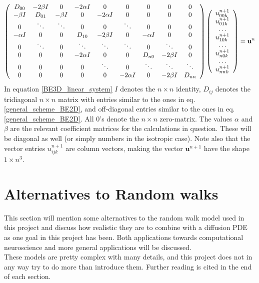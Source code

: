 \begin{align}\label{BE3D_linear_system}
  \left(\begin{array}{c c c c c c c c c}
        D_{00} & -2\beta I &0 &-2\alpha I &0 &0 &0 &0 &0\\
        -\beta I & D_{01} & -\beta I &0 &-2\alpha I &0 &0 &0 &0\\
        0&\ddots & \ddots & 0 & 0 & \ddots &0&0&0\\
        -\alpha I& 0&0 & D_{10} & -2\beta I& 0 & -\alpha I &0&0\\
        0& \ddots&0&\ddots & \ddots & \ddots & 0 & \ddots &0\\
        0& 0 &0 &-2\alpha I &0&0 & D_{n0} & -2\beta I&0\\
        0& 0 &0 &0 &\ddots&0&\ddots & \ddots &\ddots\\
         0&0 &0 &0&0 &-2\alpha I&0&-2\beta I & D_{nn}
       \end{array}\right)
       \left(\begin{array}{c}
             u^{n+1}_{00k}\\
             u^{n+1}_{01k}\\
             \dots\\
             u^{n+1}_{10k}\\
             \dots\\
             u^{n+1}_{n0k}\\
             \dots\\
             u^{n+1}_{nnk}
             \end{array}\right) = \mathbf{u}^{n}
\end{align}
In equation \ref{BE3D_linear_system} $I$ denotes the $n\times n$ identity, $D_{ij}$ denotes the tridiagonal $n\times n$ matrix with entries similar to the ones in eq. \ref{general_scheme_BE2D}, and off-diagonal entries similar to the ones in eq. \ref{general_scheme_BE2D}. 
All $0$'s denote the $n\times n$ zero-matrix. The values $\alpha$ and $\beta$ are the relevant coefficient matrices for the calculations in question. These will be diagonal as well (or simply numbers in the isotropic case). 
Note also that the vector entries $u^{n+1}_{ijk}$ are column vectors, making the vector $\mathbf{u}^{n+1}$ have the shape $1\times n^3$.


\section{Alternatives to Random walks}
This section will mention some alternatives to the random walk model used in this project and discuss how realistic they are to combine with a diffusion PDE as one goal in this project has been. 
Both applications towards computational neuroscience and more general applications will be discussed. \\
These models are pretty complex with many details, and this project does not in any way try to do more than introduce them. 
Further reading is cited in the end of each section.

